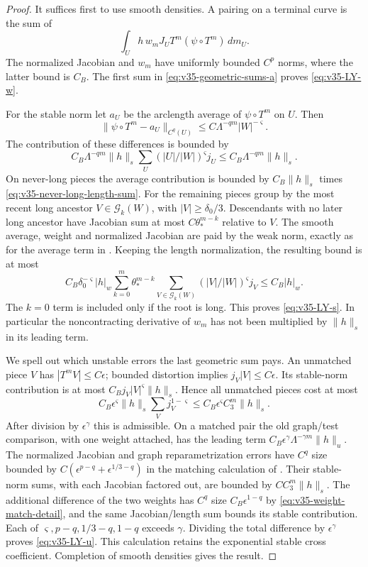 \begin{proof}
It suffices first to use smooth densities. A pairing on a terminal
curve is the sum of
\[
 \int_U h\,w_m J_UT^m(\psi\circ T^m)\,dm_U.
\]
The normalized Jacobian and $w_m$ have uniformly bounded $C^p$ norms,
where the latter bound is $C_B$. The first sum in
\eqref{eq:v35-geometric-sums-a} proves \eqref{eq:v35-LY-w}.

For the stable norm let $a_U$ be the arclength average of
$\psi\circ T^m$ on $U$. Then
\[
 \|\psi\circ T^m-a_U\|_{C^q(U)}
             \le C\Lambda^{-qm}|W|^{-\varsigma}.
\]
The contribution of these differences is bounded by
\[
 C_B\Lambda^{-qm}\|h\|_s
       \sum_U (|U|/|W|)^{\varsigma}j_U
       \le C_B\Lambda^{-qm}\|h\|_s.
\]
On never-long pieces the average contribution is bounded by
$C_B\|h\|_s$ times \eqref{eq:v35-never-long-length-sum}.
For the remaining pieces group by the most recent long ancestor
$V\in\mathcal G_k(W)$, with $|V|\ge\delta_0/3$. Descendants with no
later long ancestor have Jacobian sum at most $C\theta_*^{m-k}$
relative to $V$. The smooth average, weight and normalized Jacobian
are paid by the weak norm, exactly as for the average term in
\cite[equations (4.9)--(4.11)]{DZ}. Keeping the length normalization,
the resulting bound is at most
\[
 C_B\delta_0^{-\varsigma}|h|_w
   \sum_{k=0}^m\theta_*^{m-k}
     \sum_{V\in\mathcal G_k(W)} (|V|/|W|)^{\varsigma}j_V
 \le C_B|h|_w.
\]
The $k=0$ term is included only if the root is long. This proves
\eqref{eq:v35-LY-s}. In particular the noncontracting derivative of
$w_m$ has not been multiplied by $\|h\|_s$ in its leading term.

We spell out which unstable errors the last geometric sum pays.
An unmatched piece $V$ has $|T^mV|\le C\epsilon$; bounded distortion
implies $j_V|V|\le C\epsilon$. Its stable-norm contribution is at most
$C_B j_V|V|^{\varsigma}\|h\|_s$. Hence all unmatched pieces cost at most
\[
 C_B\epsilon^{\varsigma}\|h\|_s
                 \sum_V j_V^{1-\varsigma}
       \le C_B\epsilon^{\varsigma}C_3^m\|h\|_s.
\]
After division by $\epsilon^\gamma$ this is admissible.
On a matched pair the old graph/test comparison, with one weight
attached, has the leading term
$C_B\epsilon^\gamma\Lambda^{-\gamma m}\|h\|_u$.
The normalized Jacobian and graph reparametrization errors have
$C^q$ size bounded by
$C(\epsilon^{p-q}+\epsilon^{1/3-q})$ in the matching calculation of
\cite[Section 4.3]{DZ}. Their stable-norm sums, with each Jacobian
factored out, are bounded by $C C_3^m\|h\|_s$.
The additional difference of the two weights has $C^q$ size
$C_B\epsilon^{1-q}$ by \eqref{eq:v35-weight-match-detail}, and the
same Jacobian/length sum bounds its stable contribution. Each of
$\varsigma,p-q,1/3-q,1-q$ exceeds $\gamma$.
Dividing the total difference by $\epsilon^\gamma$ proves
\eqref{eq:v35-LY-u}. This calculation retains the exponential stable
cross coefficient. Completion of smooth densities gives the result.
\end{proof}

